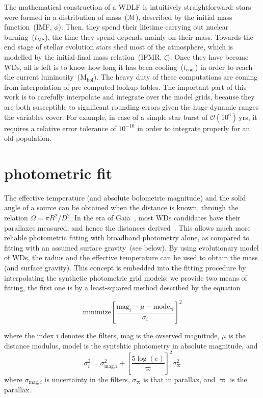 \documentclass[fleqn,usenatbib]{rasti}
\begin{document}
The mathematical construction of a WDLF is intuitively straightforward: stars
were formed in a distribution of mass~($\mathcal{M}$), described by the initial
mass function~(IMF, $\phi$). Then, they spend their lifetime carrying out
nuclear burning~($t_{\mathrm{MS}}$), the time they spend depends mainly on
their mass. Towards the end stage of stellar evolution stars shed most of the
atmosphere, which is modelled by the initial-final mass relation~(IFMR,
$\zeta$). Once they have become WDs, all is left is to know how long it has
been cooling~($t_{\mathrm{cool}}$) in order to reach the current
luminosity~($\mathrm{M}_\mathrm{bol}$). The heavy duty of these computations
are coming from interpolation of pre-computed lookup tables. The important
part of this work is to carefully interpolate and integrate over the model
grids, because they are both susceptible to significant rounding errors given
the huge dynamic ranges the variables cover. For example, in case of a simple
star burst of $\mathcal{O}(10^6)$\,yrs, it requires a relative error
tolerance of $10^{-10}$ in order to integrate properly for an old population.

\section{photometric fit}
The effective temperature (and absolute bolometric magnitude) and the solid
angle of a source can be obtained when the distance is known, through the
relation $\Omega = \pi R^2 / D^2$. In the era of
Gaia~\citep{2021A&A...649A...1G}, most WDs candidates have their parallaxes
measured, and hence the distances derived~\citep{2021AJ....161..147B}. This
allows much more reliable photometric fitting with broadband photometry alone,
as compared to fitting with an assumed surface gravity~(see below). By using
evolutionary model of WDs, the radius and the effective temperature can be used
to obtain the mass (and surface gravity). This concept is embedded into the
fitting procedure by interpolating the synthetic photometric grid models:
we provide two means of fitting, the first one is by a least-squared method
described by the equation

\begin{equation}
    \label{eq:lsq}
    \mathrm{minimize} \left[ \dfrac{\mathrm{mag}_i - \mu - \mathrm{model}_i}{\sigma_i} \right]^2
\end{equation}

where the index i denotes the filters, mag is the ovserved magnitude, $\mu$ is
the distance modulus, model is the syntehtic photometry in absolute magnitude,
and
\begin{equation}
    \sigma_i^2 = \sigma^2_{\mathrm{mag}, i} + \left[ \dfrac{5 \log(e)}{\varpi} \right]^2 \sigma_\varpi^2
\end{equation}
where $\sigma_{\mathrm{mag}, i}$ is uncertainty in the filters,
$\sigma_\varpi$ is that in parallax, and $\varpi$ is the parallax.
\end{document}
